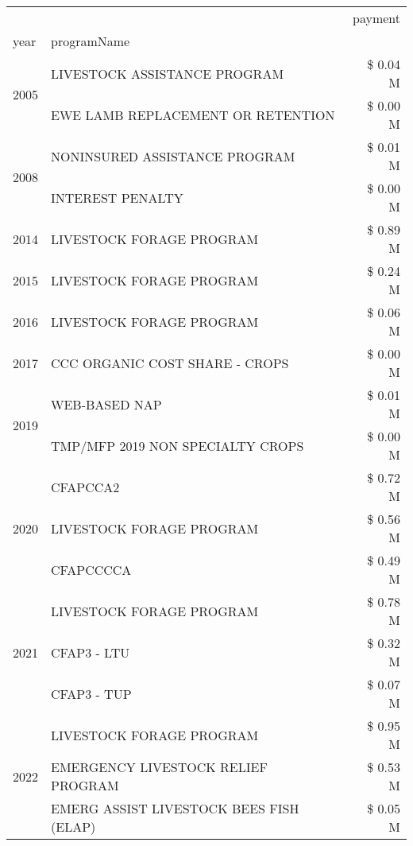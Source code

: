 \begin{tabular}{llr}
\toprule
 &  & payment \\
year & programName &  \\
\midrule
\multirow[t]{2}{*}{2005} & LIVESTOCK ASSISTANCE PROGRAM & \$ 0.04 M \\
 & EWE LAMB REPLACEMENT OR RETENTION & \$ 0.00 M \\
\cline{1-3}
\multirow[t]{2}{*}{2008} & NONINSURED ASSISTANCE PROGRAM & \$ 0.01 M \\
 & INTEREST PENALTY & \$ 0.00 M \\
\cline{1-3}
2014 & LIVESTOCK FORAGE PROGRAM & \$ 0.89 M \\
\cline{1-3}
2015 & LIVESTOCK FORAGE PROGRAM & \$ 0.24 M \\
\cline{1-3}
2016 & LIVESTOCK FORAGE PROGRAM & \$ 0.06 M \\
\cline{1-3}
2017 & CCC ORGANIC COST SHARE - CROPS & \$ 0.00 M \\
\cline{1-3}
\multirow[t]{2}{*}{2019} & WEB-BASED NAP & \$ 0.01 M \\
 & TMP/MFP 2019 NON SPECIALTY CROPS & \$ 0.00 M \\
\cline{1-3}
\multirow[t]{3}{*}{2020} & CFAPCCA2 & \$ 0.72 M \\
 & LIVESTOCK FORAGE PROGRAM & \$ 0.56 M \\
 & CFAPCCCCA & \$ 0.49 M \\
\cline{1-3}
\multirow[t]{3}{*}{2021} & LIVESTOCK FORAGE PROGRAM & \$ 0.78 M \\
 & CFAP3 - LTU & \$ 0.32 M \\
 & CFAP3 - TUP & \$ 0.07 M \\
\cline{1-3}
\multirow[t]{3}{*}{2022} & LIVESTOCK FORAGE PROGRAM & \$ 0.95 M \\
 & EMERGENCY LIVESTOCK RELIEF PROGRAM & \$ 0.53 M \\
 & EMERG ASSIST LIVESTOCK BEES FISH (ELAP) & \$ 0.05 M \\
\cline{1-3}
\bottomrule
\end{tabular}
